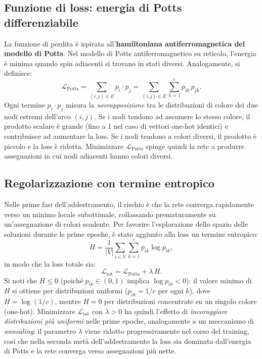 \documentclass[11pt, a4paper]{article}
\begin{document}
\subsection*{Funzione di loss: energia di Potts differenziabile}

La funzione di perdita è ispirata all'\textbf{hamiltoniana antiferromagnetica del modello
di Potts}. Nel modello di Potts antiferromagnetico su reticolo, l'energia è minima quando
spin adiacenti si trovano in stati diversi. Analogamente, si definisce:
\begin{equation}
    \mathcal{L}_{\mathrm{Potts}} = \sum_{(i,j)\in E} p_i \cdot p_j
    = \sum_{(i,j)\in E} \sum_{k=1}^c p_{ik}\, p_{jk}.
\end{equation}
Ogni termine $p_i \cdot p_j$ misura la \emph{sovrapposizione} tra le distribuzioni di
colore dei due nodi estremi dell'arco $(i,j)$. Se i nodi tendono ad assumere lo stesso
colore, il prodotto scalare è grande (fino a 1 nel caso di vettori one-hot identici) e
contribuisce ad aumentare la loss. Se i nodi tendono a colori diversi, il prodotto è
piccolo e la loss è ridotta. Minimizzare $\mathcal{L}_{\mathrm{Potts}}$ spinge quindi la
rete a produrre assegnazioni in cui nodi adiacenti hanno colori diversi.

\subsection*{Regolarizzazione con termine entropico}

Nelle prime fasi dell'addestramento, il rischio è che la rete converga rapidamente verso
un minimo locale subottimale, collassando prematuramente su un'assegnazione di colori
scadente. Per favorire l'esplorazione dello spazio delle soluzioni durante le prime epoche,
è stato aggiunto alla loss un termine entropico:
\begin{equation}
    H = \frac{1}{|V|} \sum_{i \in V} \sum_{k=1}^c p_{ik} \log p_{ik},
\end{equation}
in modo che la loss totale sia:
\begin{equation}
    \mathcal{L}_{\mathrm{tot}} = \mathcal{L}_{\mathrm{Potts}} + \lambda\, H.
\end{equation}
Si noti che $H \leq 0$ (poiché $p_{ik} \in (0,1)$ implica $\log p_{ik} < 0$): il valore
minimo di $H$ si ottiene per distribuzioni uniformi ($p_{ik} = 1/c$ per ogni $k$), dove
$H = \log(1/c)$, mentre $H = 0$ per distribuzioni concentrate su un singolo colore
(one-hot). Minimizzare $\mathcal{L}_{\mathrm{tot}}$ con $\lambda > 0$ ha quindi l'effetto
di \emph{incoraggiare distribuzioni più uniformi} nelle prime epoche, analogamente a un
meccanismo di \textit{annealing}: il parametro $\lambda$ viene ridotto progressivamente
nel corso del training, così che nella seconda metà dell'addestramento la loss sia
dominata dall'energia di Potts e la rete converga verso assegnazioni più nette.
\end{document}
